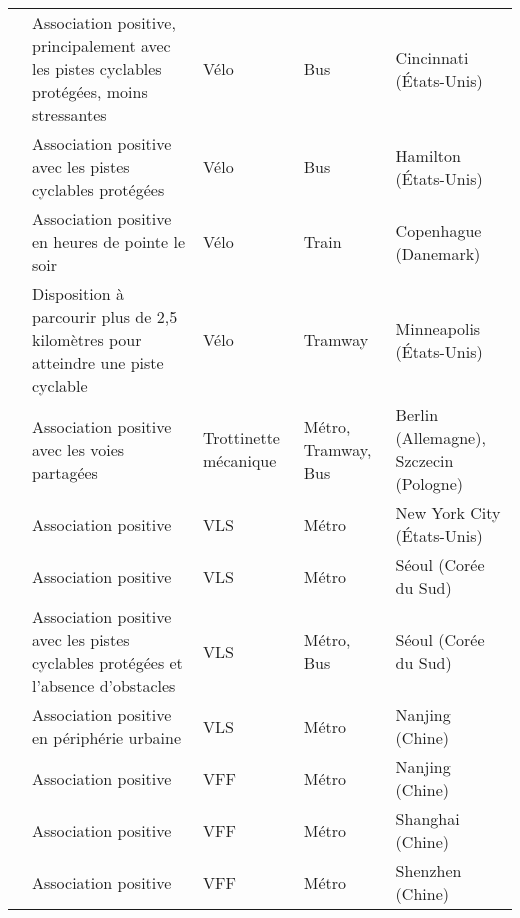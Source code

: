 \begin{longtable}{p{3cm}p{4cm}p{1.5cm}p{1.8cm}p{2.3cm}}
    \small{\textcite{zuo_bikeway_2019}}\index{Zuo, Ting|pagebf} & \small{Association positive, principalement avec les pistes cyclables protégées, moins stressantes} & \small{Vélo} & \small{Bus} & \small{Cincinnati (États-Unis)}\\
    \small{\textcite{zuo_incorporating_2021}}\index{Zuo, Ting|pagebf} & \small{Association positive avec les pistes cyclables protégées} & \small{Vélo} & \small{Bus} & \small{Hamilton (États-Unis)}\\
    \small{\textcite{halldorsdottir_home-end_2017}}\index{Halldórsdóttir, Katrín|pagebf} & \small{Association positive en heures de pointe le soir} & \small{Vélo} & \small{Train} & \small{Copenhague (Danemark)}\\
    \small{\textcite{krizek_detailed_2007}}\index{Krizek, Kevin J.|pagebf} & \small{Disposition à parcourir plus de 2,5 kilomètres pour atteindre une piste cyclable} & \small{Vélo} & \small{Tramway} & \small{Minneapolis (États-Unis)}\\
    \small{\textcite{kostrzewska_towards_2017}} & \small{Association positive avec les voies partagées} & \small{Trottinette mécanique} & \small{Métro, Tramway, Bus} & \small{Berlin (Allemagne), Szczecin (Pologne)}\\
    \small{\textcite{ashraf_impacts_2021}}\index{Ashraf, Md Tanvir|pagebf} & \small{Association positive} & \small{VLS} & \small{Métro} & \small{New York City (États-Unis)}\\
    \small{\textcite{cho_estimation_2022}}\index{Cho, Shin-Hyung|pagebf} & \small{Association positive} & \small{VLS} & \small{Métro} & \small{Séoul (Corée du Sud)}\\
    \small{\textcite{kim_analysis_2021}}\index{Kim, Minjun|pagebf} & \small{Association positive avec les pistes cyclables protégées et l'absence d'obstacles} & \small{VLS} & \small{Métro, Bus} & \small{Séoul (Corée du Sud)}\\
    \small{\textcite{ji_exploring_2018}}\index{Ji, Yanjie|pagebf} & \small{Association positive en périphérie urbaine} & \small{VLS} & \small{Métro} & \small{Nanjing (Chine)}\\
    \small{\textcite{liu_use_2020}}\index{Liu, Yang|pagebf} & \small{Association positive} & \small{VFF} & \small{Métro} & \small{Nanjing (Chine)}\\
    \small{\textcite{lin_analysis_2019}}\index{Lin, Diao|pagebf} & \small{Association positive} & \small{VFF} & \small{Métro} & \small{Shanghai (Chine)}\\
    \small{\textcite{wu_measuring_2019}}\index{Wu, Xueying|pagebf} & \small{Association positive} & \small{VFF} & \small{Métro} & \small{Shenzhen (Chine)}\\

\end{longtable}
